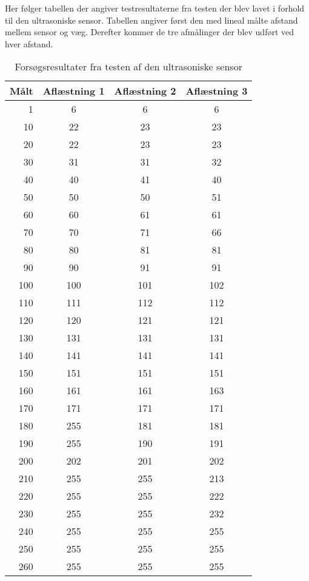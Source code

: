 
\label{appendix:ultrasonisk}
Her følger tabellen der angiver testresultaterne fra testen der blev lavet i forhold til den ultrasoniske sensor.
Tabellen angiver først den med lineal målte afstand mellem sensor og væg.
Derefter kommer de tre afmålinger der blev udført ved hver afstand.
\begin{table}[H]
\centering
\begin{tabular}{r | c | c | c |}
Målt & Aflæstning 1 & Aflæstning 2 & Aflæstning 3 \\
\hline
1 & 6 & 6 & 6 \\
10&	22&	23&	23\\
20&	22&	23&	23\\
30&	31&	31&	32\\
40&	40&	41&	40\\
50&	50&	50&	51\\
60&	60&	61&	61\\
70&	70&	71&	66\\
80&	80&	81&	81\\
90&	90&	91&	91\\
100&	100&	101&	102\\
110&	111&	112&	112\\
120&	120&	121&	121\\
130&	131&	131&	131\\
140&	141&	141&	141\\
150&	151&	151&	151\\
160&	161&	161&	163\\
170&	171&	171&	171\\
180&	255&	181&	181\\
190&	255&	190&	191\\
200&	202&	201&	202\\
210&	255&	255&	213\\
220&	255&	255&	222\\
230&	255&	255&	232\\
240&	255&	255&	255\\
250&	255&	255&	255\\
260&	255&	255&	255\\
\end{tabular}
\caption{Forsøgsresultater fra testen af den ultrasoniske sensor}
\label{sensor:ultrasonic_test_data}
\end{table}